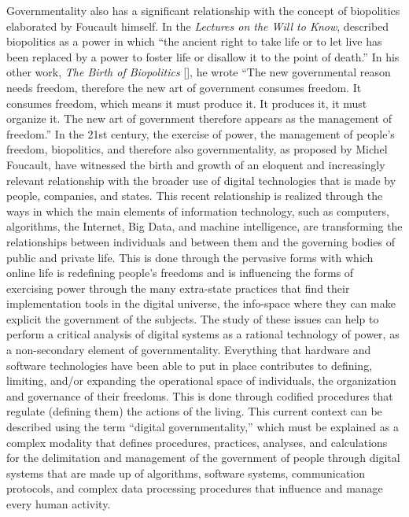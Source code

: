 Governmentality also has a significant relationship with the concept of biopolitics elaborated by Foucault himself. In the \textit{Lectures on the Will to Know}, \citet{chap:9:Foucault:2013} described biopolitics as a power in which ``the ancient right to take life or to let live has been replaced by a power to foster life or disallow it to the point of death.'' In his other work, \textit{The Birth of Biopolitics} [\citealt{chap:9:Foucault:2008}], he wrote ``The new governmental reason needs freedom, therefore the new art of government consumes freedom. It consumes freedom, which means it must produce it. It produces it, it must organize it. The new art of government therefore appears as the management of freedom.'' In the 21st century, the exercise of power, the management of people's freedom, biopolitics, and therefore also governmentality, as proposed by Michel Foucault, have witnessed the birth and growth of an eloquent and increasingly relevant relationship with the broader use of digital technologies that is made by people, companies, and states. This recent relationship is realized through the ways in which the main elements of information technology, such as computers, algorithms, the Internet, Big Data, and machine intelligence, are transforming the relationships between individuals and between them and the governing bodies of public and private life. This is done through the pervasive forms with which online life is redefining people's freedoms and is influencing the forms of exercising power through the many extra-state practices that find their implementation tools in the digital universe, the info-space where they can make explicit the government of the subjects. The study of these issues can help to perform a critical analysis of digital systems as a rational technology of power, as a non-secondary element of governmentality. Everything that hardware and software technologies have been able to put in place contributes to defining, limiting, and/or expanding the operational space of individuals, the organization and governance of their freedoms. This is done through codified procedures that regulate (defining them) the actions of the living. This current context can be described using the term ``digital governmentality,'' which must be explained as a complex modality that defines procedures, practices, analyses, and calculations for the delimitation and management of the government of people through digital systems that are made up of algorithms, software systems, communication protocols, and complex data processing procedures that influence and manage every human activity.

